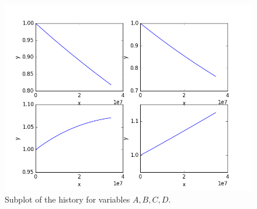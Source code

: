 \begin{figure}[h!]
  \centering
  \includegraphics[scale=0.7]{../../tests/framework/user_guide/ravenTutorial/gold/subPlot/1-historyPlot_line-line-line-line.png}
  \caption{Subplot of the history for variables $A,B,C,D$.}
  \label{fig:historySubPlotLine}
\end{figure}
